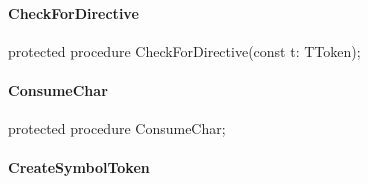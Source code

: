 \documentclass{report}
\newif\ifpdf
\begin{document}
\paragraph*{CheckForDirective}\hspace*{\fill}

\label{PasDoc_Tokenizer.TTokenizer-CheckForDirective}
\begin{list}{}{
\setlength{\itemindent}{0cm}
\setlength{\listparindent}{0cm}
\setlength{\leftmargin}{\evensidemargin}
\addtolength{\leftmargin}{\tmplength}
\settowidth{\labelsep}{X}
\addtolength{\leftmargin}{\labelsep}
\setlength{\labelwidth}{\tmplength}
}
\item[\textbf{Declaration}\hfill]
\ifpdf
\begin{flushleft}
\fi
\begin{ttfamily}
protected procedure CheckForDirective(const t: TToken);\end{ttfamily}

\ifpdf
\end{flushleft}
\fi

\end{list}
\paragraph*{ConsumeChar}\hspace*{\fill}

\label{PasDoc_Tokenizer.TTokenizer-ConsumeChar}
\begin{list}{}{
\setlength{\itemindent}{0cm}
\setlength{\listparindent}{0cm}
\setlength{\leftmargin}{\evensidemargin}
\addtolength{\leftmargin}{\tmplength}
\settowidth{\labelsep}{X}
\addtolength{\leftmargin}{\labelsep}
\setlength{\labelwidth}{\tmplength}
}
\item[\textbf{Declaration}\hfill]
\ifpdf
\begin{flushleft}
\fi
\begin{ttfamily}
protected procedure ConsumeChar;\end{ttfamily}

\ifpdf
\end{flushleft}
\fi

\end{list}
\paragraph*{CreateSymbolToken}\hspace*{\fill}
\end{document}
